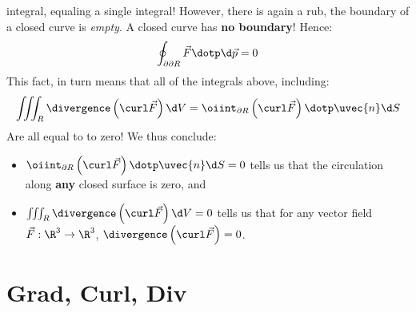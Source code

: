 \documentclass{ximera}
\begin{document}
integral, equaling a single integral! However, there is again a rub,
the boundary of a closed curve is \textit{empty}. A closed curve has
\textbf{no boundary}! Hence:
\[
\oint_{\partial\partial R} \vec{F}\dotp \d \vec{p} = 0
\]
This fact, in turn means that all of the integrals above, including:
\[
\iiint_R \divergence\left(\curl\vec{F}\right)\d V = \oiint_{\partial R} \left(\curl \vec{F}\right)\dotp \uvec{n} \d S
\]
Are all equal to to zero!  We thus conclude:
\begin{itemize}
\item $\oiint_{\partial R} \left(\curl \vec{F}\right)\dotp \uvec{n} \d
  S=0$ tells us that the circulation along \textbf{any} closed surface
  is zero, and
\item $\iiint_R \divergence\left(\curl\vec{F}\right)\d V = 0$ tells us
  that for any vector field $\vec{F}:\R^3\to\R^3$,
  $\divergence\left(\curl\vec{F}\right)=0$.
\end{itemize}



\section{Grad, Curl, Div}

\begin{image}
\end{image}

\begin{image}
\end{image}
  
\end{document}
